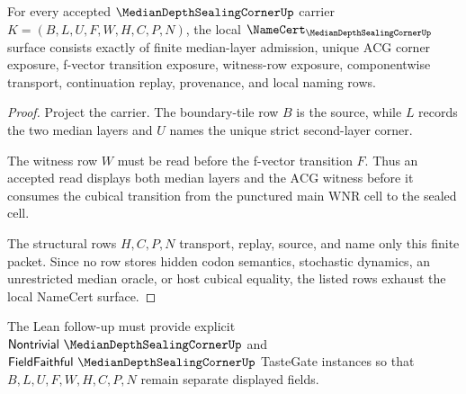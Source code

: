 \begin{theorem}
\label{thm:median-depth-sealing-corner-namecert-obligations}
For every accepted $\MedianDepthSealingCornerUp$ carrier $K=(B,L,U,F,W,H,C,P,N)$, the local $\NameCert_{\MedianDepthSealingCornerUp}$ surface consists exactly of finite median-layer admission, unique $\mathrm{ACG}$ corner exposure, f-vector transition exposure, witness-row exposure, componentwise transport, continuation replay, provenance, and local naming rows.
\end{theorem}
\begin{proof}
Project the carrier. The boundary-tile row $B$ is the source, while $L$ records the two median layers and $U$ names the unique strict second-layer corner.

The witness row $W$ must be read before the f-vector transition $F$. Thus an accepted read displays both median layers and the $\mathrm{ACG}$ witness before it consumes the cubical transition from the punctured main $\mathrm{WNR}$ cell to the sealed cell.

The structural rows $H,C,P,N$ transport, replay, source, and name only this finite packet. Since no row stores hidden codon semantics, stochastic dynamics, an unrestricted median oracle, or host cubical equality, the listed rows exhaust the local NameCert surface.
\end{proof}



The Lean follow-up must provide explicit $\mathsf{Nontrivial}\ \MedianDepthSealingCornerUp$ and $\mathsf{FieldFaithful}\ \MedianDepthSealingCornerUp$ TasteGate instances so that $B,L,U,F,W,H,C,P,N$ remain separate displayed fields.


